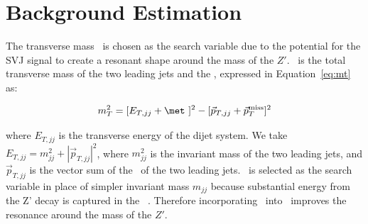 \section{Background Estimation}
\label{sec:background}


The transverse mass \mt~is chosen as the search variable due to the potential for the SVJ signal to create a resonant shape around the mass of the $Z'$. \mt~is the total transverse mass of the two leading jets and the \met, expressed in Equation~\ref{eq:mt} as:

\begin{equation}
m_T^2 = [E_{T,jj} + \met~]^2 - [\vec{p}_{T,jj} + \vec{p}_T^{\text{miss}}]^2
\label{eq:mt}
\end{equation}

where $E_{T,jj}$ is the transverse energy of the dijet system. We take $E_{T,jj} = m_{jj}^2 + |\vec{p}_{T,jj}|^2$, where $m_{jj}^2$ is the invariant mass of the two leading jets, and $\vec{p}_{T,jj}$ is the vector sum of the \pt~of the two leading jets. \mt~is selected as the search variable in place of simpler invariant mass $m_{jj}$ because substantial energy from the Z' decay is captured in the \met~. Therefore incorporating \met~into \mt~improves the resonance around the mass of the $Z'$. \par

